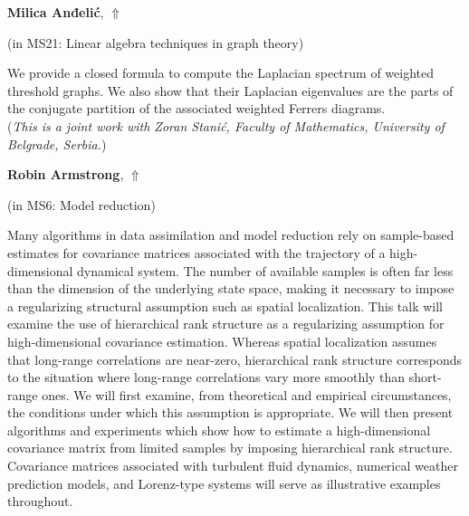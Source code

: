 \documentclass[ILAS2025-program.tex]{subfiles}
\begin{document}
     \hypertarget{down0338}{}\begin{ilasabstract}
    
    \textbf{Milica Anđelić},  \hfill \hyperlink{up0338}{$\Uparrow$}
    
    (in {\color{mstitle}MS21: Linear algebra techniques in graph theory})
        
        \mtskip
    We provide a closed  formula to compute the Laplacian spectrum of weighted threshold graphs. We also  show that their Laplacian eigenvalues are the parts of the conjugate partition of the associated   weighted Ferrers diagrams. \\

({\it This is a joint work with Zoran Stani\'c, Faculty of Mathematics, University of Belgrade, Serbia.})\end{ilasabstract}
     \hypertarget{down0210}{}\begin{ilasabstract}
    
    \textbf{Robin Armstrong},  \hfill \hyperlink{up0210}{$\Uparrow$}
    
    (in {\color{mstitle}MS6: Model reduction})
        
        \mtskip
    Many algorithms in data assimilation and model reduction rely on sample-based estimates for covariance matrices associated with the trajectory of a high-dimensional dynamical system. The number of available samples is often far less than the dimension of the underlying state space, making it necessary to impose a regularizing structural assumption such as spatial localization. This talk will examine the use of hierarchical rank structure as a regularizing assumption for high-dimensional covariance estimation. Whereas spatial localization assumes that long-range correlations are near-zero, hierarchical rank structure corresponds to the situation where long-range correlations vary more smoothly than short-range ones. We will first examine, from theoretical and empirical circumstances, the conditions under which this assumption is appropriate. We will then present algorithms and experiments which show how to estimate a high-dimensional covariance matrix from limited samples by imposing hierarchical rank structure. Covariance matrices associated with turbulent fluid dynamics, numerical weather prediction models, and Lorenz-type systems will serve as illustrative examples throughout.
\end{ilasabstract}
\end{document}
